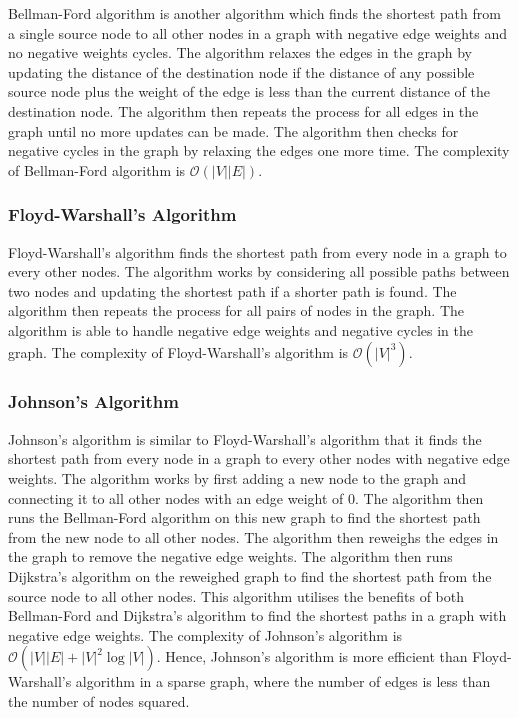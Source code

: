 Bellman-Ford algorithm is another algorithm which finds the shortest path from a single source node to all other nodes in a graph with negative edge weights and no negative weights cycles. The algorithm relaxes the edges in the graph by updating the distance of the destination node if the distance of any possible source node plus the weight of the edge is less than the current distance of the destination node. The algorithm then repeats the process for all edges in the graph until no more updates can be made. The algorithm then checks for negative cycles in the graph by relaxing the edges one more time. The complexity of Bellman-Ford algorithm is $\mathcal{O}(|V||E|)$.

\subsubsection{Floyd-Warshall's Algorithm}

Floyd-Warshall's algorithm finds the shortest path from every node in a graph to every other nodes. The algorithm works by considering all possible paths between two nodes and updating the shortest path if a shorter path is found. The algorithm then repeats the process for all pairs of nodes in the graph. The algorithm is able to handle negative edge weights and negative cycles in the graph. The complexity of Floyd-Warshall's algorithm is $\mathcal{O}(|V|^3)$.

\subsubsection{Johnson's Algorithm}

Johnson's algorithm is similar to Floyd-Warshall's algorithm that it finds the shortest path from every node in a graph to every other nodes with negative edge weights. The algorithm works by first adding a new node to the graph and connecting it to all other nodes with an edge weight of $0$. The algorithm then runs the Bellman-Ford algorithm on this new graph to find the shortest path from the new node to all other nodes. The algorithm then reweighs the edges in the graph to remove the negative edge weights. The algorithm then runs Dijkstra's algorithm on the reweighed graph to find the shortest path from the source node to all other nodes. This algorithm utilises the benefits of both Bellman-Ford and Dijkstra's algorithm to find the shortest paths in a graph with negative edge weights. The complexity of Johnson's algorithm is $\mathcal{O}(|V||E|+|V|^2\log |V|)$. Hence, Johnson's algorithm is more efficient than Floyd-Warshall's algorithm in a sparse graph, where the number of edges is less than the number of nodes squared.

